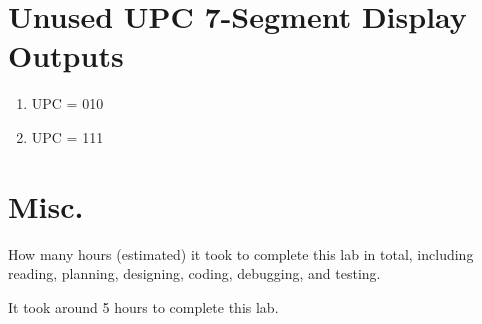 \documentclass{article}
\newenvironment{solution}{\begin{mdframed}[style=SolutionFrame]}{\end{mdframed}}
\newenvironment{enum}{\begin{enumerate}[label={(\alph*)}]}{\end{enumerate}}
\begin{document}
\section{Unused UPC 7-Segment Display Outputs}
    \begin{enum}
        \item UPC = 010
            \begin{mdframed}[style=SolutionFrame, backgroundcolor=black]
                \begin{center}
                     \quad
                     \quad
                     \quad
                     \quad
                     \quad
                \end{center}
            \end{mdframed}
        \item UPC = 111
            \begin{mdframed}[style=SolutionFrame, backgroundcolor=black]
                \begin{center}
                     \quad
                     \quad
                     \quad
                     \quad
                     \quad
                \end{center}
            \end{mdframed}
    \end{enum}

\section{Misc.}
    How many hours (estimated) it took to complete this lab in total, including reading, planning, designing, coding, debugging, and testing.
    \begin{solution}
        It took around 5 hours to complete this lab.
    \end{solution}
\end{document}
